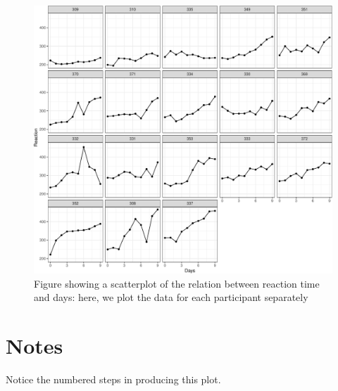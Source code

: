 \documentclass[
  letterpaper,
  DIV=11,
  numbers=noendperiod]{scrreprt}
\begin{document}
\begin{figure}[H]

{\centering \includegraphics{visualization_files/figure-pdf/fig-sleep-study-scatterplot-by-subject-1.pdf}

}

\caption{\label{fig-sleep-study-scatterplot-by-subject}Figure showing a
scatterplot of the relation between reaction time and days: here, we
plot the data for each participant separately}

\end{figure}

\section{Notes}

Notice the numbered steps in producing this plot.
\end{document}
